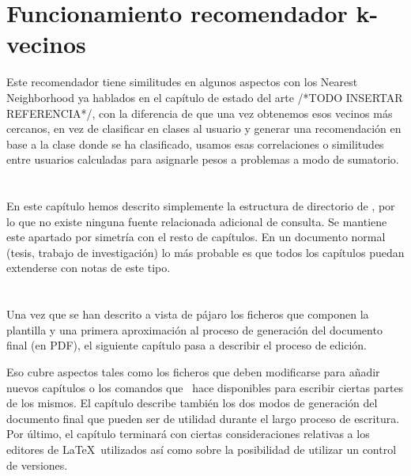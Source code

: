\section{Funcionamiento recomendador k-vecinos}
\label{cap3:sec:funcionamiento}

Este recomendador tiene similitudes en algunos aspectos con los Nearest Neighborhood ya hablados en el capítulo de estado del arte /*TODO INSERTAR REFERENCIA*/, con la diferencia de que una vez obtenemos esos vecinos más cercanos, en vez de clasificar en clases al usuario y generar una recomendación en base a la clase donde se ha clasificado, usamos esas correlaciones o similitudes entre usuarios calculadas para asignarle pesos a problemas a modo de sumatorio.







\section*{\NotasBibliograficas}
\TocNotasBibliograficas

En este capítulo hemos descrito simplemente la estructura de
directorio de \texis, por lo que no existe ninguna fuente
relacionada adicional de consulta. Se mantiene este apartado por
simetría con el resto de capítulos. En un documento normal (tesis,
trabajo de investigación) lo más probable es que todos los capítulos
puedan extenderse con notas de este tipo.

\section*{\ProximoCapitulo}
\TocProximoCapitulo

Una vez que se han descrito a vista de pájaro los ficheros que
componen la plantilla y una primera aproximación al proceso de
generación del documento final (en PDF), el siguiente capítulo pasa a
describir el proceso de edición.

Eso cubre aspectos tales como los ficheros que deben modificarse para
añadir nuevos capítulos o los comandos que \texis\ hace
disponibles para escribir ciertas partes de los mismos. El capítulo
describe también los dos modos de generación del documento final que
pueden ser de utilidad durante el largo proceso de escritura. Por
último, el capítulo terminará con ciertas consideraciones relativas a
los editores de \LaTeX\ utilizados así como sobre la posibilidad de
utilizar un control de versiones.

